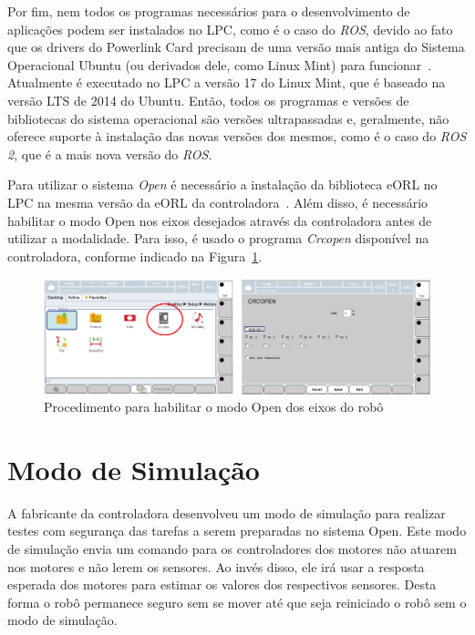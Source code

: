         Por fim, nem todos os programas necessários para o desenvolvimento de aplicações podem ser instalados no \ac{LPC}, como é o caso do \textit{ROS}, devido ao fato que os drivers do Powerlink Card precisam de uma versão mais antiga do Sistema Operacional Ubuntu (ou derivados dele, como Linux Mint) para funcionar~\cite{Bisson:2014}. Atualmente é executado no \ac{LPC} a versão 17 do Linux Mint, que é baseado na versão \ac{LTS} de 2014 do Ubuntu. Então, todos os programas e versões de bibliotecas do sistema operacional são versões ultrapassadas e, geralmente, não oferece suporte à instalação das novas versões dos mesmos, como é o caso do \textit{ROS 2}, que é a mais nova versão do \textit{ROS}.
        
        Para utilizar o sistema \textit{Open} é necessário a instalação da biblioteca \ac{eORL} no \ac{LPC} na mesma versão da \ac{eORL} da controladora~\cite{Open:Manual}. Além disso, é necessário habilitar o modo Open nos eixos desejados através da controladora antes de utilizar a modalidade. Para isso, é usado o programa \textit{Crcopen} disponível na controladora, conforme indicado na Figura~\ref{habilitar-open}.
        
        \begin{figure}[ht]
            \centering
            \includegraphics[width=\columnwidth]{imagens/Softwares/habilitar-open.png}
            \small 
            \centering 
            \caption{Procedimento para habilitar o modo Open dos eixos do robô~\cite{Open:Manual}}
            \label{habilitar-open}
        \end{figure}
        
    \section{Modo de Simulação}
        
        A fabricante da controladora desenvolveu um modo de simulação para realizar testes com segurança das tarefas a serem preparadas no sistema Open. Este modo de simulação envia um comando para os controladores dos motores não atuarem nos motores e não lerem os sensores. Ao invés disso, ele irá usar a resposta esperada dos motores para estimar os valores dos respectivos sensores. Desta forma o robô permanece seguro sem se mover até que seja reiniciado o robô sem o modo de simulação.
        
